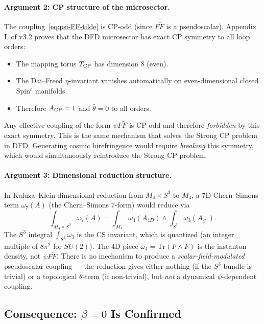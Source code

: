 \documentclass[11pt]{article}
\newcommand{\CS}{Chern--Simons}
\begin{document}
\paragraph{Argument 2: CP structure of the microsector.}
The coupling~\eqref{eq:psi-FF-tilde} is CP-odd (since $F\tilde{F}$
is a pseudoscalar).  Appendix L of v3.2 proves that the DFD
microsector has exact CP symmetry to all loop orders:
\begin{itemize}
\item The mapping torus $T_{\rm CP}$ has dimension 8 (even).
\item The Dai--Freed $\eta$-invariant vanishes automatically
  on even-dimensional closed Spin$^c$ manifolds.
\item Therefore $A_{\rm CP} = 1$ and $\bar{\theta} = 0$ to all orders.
\end{itemize}
Any effective coupling of the form $\psi F\tilde{F}$ is CP-odd
and therefore \emph{forbidden} by this exact symmetry.  This is the
same mechanism that solves the Strong CP problem in DFD.  Generating
cosmic birefringence would require \emph{breaking} this symmetry,
which would simultaneously reintroduce the Strong CP problem.

\paragraph{Argument 3: Dimensional reduction structure.}
In Kaluza--Klein dimensional reduction from $M_4 \times S^3$ to
$M_4$, a 7D \CS{} term $\omega_7(A)$ (the Chern--Simons 7-form)
would reduce via
\begin{equation}
\int_{M_4 \times S^3} \omega_7(A) = \int_{M_4} \omega_4(A_{4D})
  \wedge \int_{S^3} \omega_3(A_{S^3}).
\end{equation}
The $S^3$ integral $\int_{S^3} \omega_3$ is the CS invariant,
which is quantized (an integer multiple of $8\pi^2$ for $SU(2)$).
The 4D piece $\omega_4 = \mathrm{Tr}(F \wedge F)$ is the
instanton density, not $\psi F\tilde{F}$.  There is no mechanism
to produce a \emph{scalar-field-modulated} pseudoscalar coupling
--- the reduction gives either nothing (if the $S^3$ bundle is
trivial) or a topological $\theta$-term (if non-trivial), but
\emph{not} a dynamical $\psi$-dependent coupling.

\subsection{Consequence: $\beta = 0$ Is Confirmed}
\end{document}
